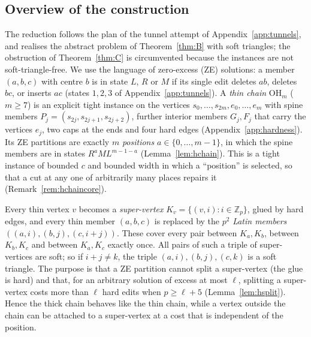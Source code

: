 \subsection{Overview of the construction}\label{sec:houtline}
The reduction follows the plan of the tunnel attempt of Appendix~\ref{app:tunnels}, and realises the abstract problem of Theorem~\ref{thm:B} with soft triangles; the obstruction of Theorem~\ref{thm:C} is circumvented because the instances are not soft-triangle-free. We use the language of zero-excess (ZE) solutions: a member $(a,b,c)$ with centre $b$ is in state $L$, $R$ or $M$ if its single edit deletes $ab$, deletes $bc$, or inserts $ac$ (states $1,2,3$ of Appendix~\ref{app:tunnels}).
 A \emph{thin chain} $\mathrm{OH}_m$ ($m\ge7$) is an explicit tight instance on the vertices $s_0,\dots,s_{2m},e_0,\dots,e_m$ with spine members $P_j=(s_{2j},s_{2j+1},s_{2j+2})$, further interior members $G_j,F_j$ that carry the vertices $e_j$, two caps at the ends and four hard edges (Appendix~\ref{app:hardness}). Its ZE partitions are exactly $m$ \emph{positions} $a\in\{0,\dots,m-1\}$, in which the spine members are in states $R^{a}ML^{m-1-a}$ (Lemma~\ref{lem:hchain}). This is a tight instance of bounded $c$ and bounded width in which a ``position'' is selected, so that a cut at any one of arbitrarily many places repairs it (Remark~\ref{rem:hchaincore}).

 Every thin vertex $v$ becomes a \emph{super-vertex} $K_v=\{(v,i):i\in\mathbb Z_p\}$, glued by hard edges, and every thin member $(a,b,c)$ is replaced by the $p^2$ \emph{Latin members} $((a,i),(b,j),(c,i+j))$. These cover every pair between $K_a,K_b$, between $K_b,K_c$ and between $K_a,K_c$ exactly once. All pairs of such a triple of super-vertices are soft; so if $i+j\ne k$, the triple $(a,i),(b,j),(c,k)$ is a soft triangle. The purpose is that a ZE partition cannot split a super-vertex (the glue is hard) and that, for an arbitrary solution of excess at most $\ell$, splitting a super-vertex costs more than $\ell$ hard edits when $p\ge\ell+5$ (Lemma~\ref{lem:hsplit}). Hence the thick chain behaves like the thin chain, while a vertex outside the chain can be attached to a super-vertex at a cost that is independent of the position.

